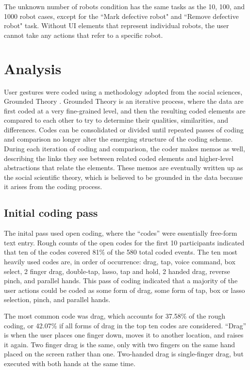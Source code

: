 \documentclass[]{article}
\begin{document}
The unknown number of robots condition has the same tasks as the 10, 100, and 1000 robot cases, except for the ``Mark defective robot" and ``Remove defective robot" task. 
Without UI elements that represent individual robots, the user cannot take any actions that refer to a specific robot. 

\section{Analysis}

User gestures were coded using a methodology adopted from the social sciences, Grounded Theory .
Grounded Theory is an iterative process, where the data are first coded at a very fine-grained level, and then the resulting coded elements are compared to each other to try to determine their qualities, similarities, and differences. 
Codes can be consolidated or divided until repeated passes of coding and comparison no longer alter the emerging structure of the coding scheme. 
During each iteration of coding and comparison, the coder makes memos as well, describing the links they see between related coded elements and higher-level abstractions that relate the elements. 
These memos are eventually written up as the social scientific theory, which is believed to be grounded in the data because it arises from the coding process. 

\subsection{Initial coding pass}

The inital pass used open coding, where the ``codes'' were essentially free-form text entry. 
Rough counts of the open codes for the first 10 participants indicated that ten of the codes covered 81\% of the 580 total coded events. 
The ten most heavily used codes are, in order of occurrence: drag, tap, voice command, box select, 2 finger drag, double-tap, lasso, tap and hold, 2 handed drag, reverse pinch, and parallel hands. 
This pass of coding indicated that a majority of the user actions could be coded as some form of drag, some form of tap, box or lasso selection, pinch, and parallel hands. 

The most common code was drag, which accounts for 37.58\% of the rough coding, or 42.07\% if all forms of drag in the top ten codes are considered. ``Drag'' is when the user places one finger down, moves it to another location, and raises it again. Two finger drag is the same, only with two fingers on the same hand placed on the screen rather than one. Two-handed drag is single-finger drag, but executed with both hands at the same time. 
\end{document}
